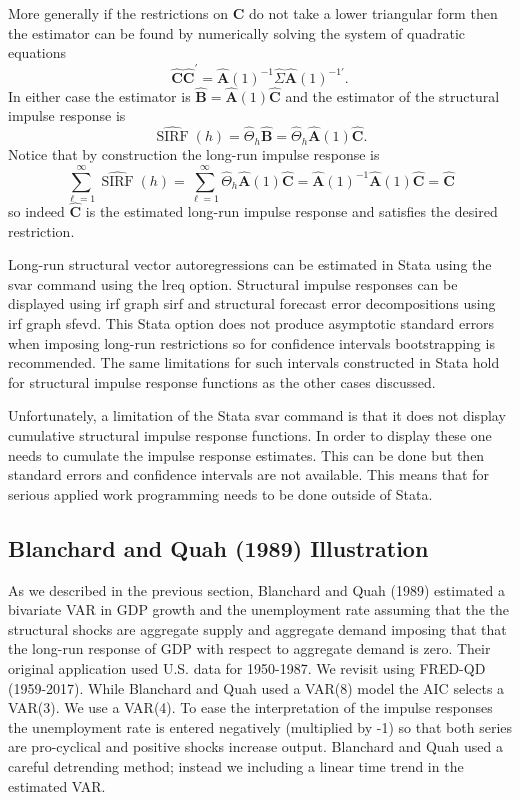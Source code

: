 \documentclass[10pt]{article}
\begin{document}
More generally if the restrictions on $\boldsymbol{C}$ do not take a lower triangular form then the estimator can be found by numerically solving the system of quadratic equations
$$
\widehat{\boldsymbol{C}} \widehat{\boldsymbol{C}}^{\prime}=\widehat{\boldsymbol{A}}(1)^{-1} \widehat{\Sigma} \widehat{\boldsymbol{A}}(1)^{-1 \prime} .
$$
In either case the estimator is $\widehat{\boldsymbol{B}}=\widehat{\boldsymbol{A}}(1) \widehat{\boldsymbol{C}}$ and the estimator of the structural impulse response is
$$
\widehat{\operatorname{SIRF}}(h)=\widehat{\Theta}_{h} \widehat{\boldsymbol{B}}=\widehat{\Theta}_{h} \widehat{\boldsymbol{A}}(1) \widehat{\boldsymbol{C}} .
$$
Notice that by construction the long-run impulse response is
$$
\sum_{\ell=1}^{\infty} \widehat{\operatorname{SIRF}}(h)=\sum_{\ell=1}^{\infty} \widehat{\Theta}_{h} \widehat{\boldsymbol{A}}(1) \widehat{\boldsymbol{C}}=\widehat{\boldsymbol{A}}(1)^{-1} \widehat{\boldsymbol{A}}(1) \widehat{\boldsymbol{C}}=\widehat{\boldsymbol{C}}
$$
so indeed $\widehat{\boldsymbol{C}}$ is the estimated long-run impulse response and satisfies the desired restriction.

Long-run structural vector autoregressions can be estimated in Stata using the svar command using the lreq option. Structural impulse responses can be displayed using irf graph sirf and structural forecast error decompositions using irf graph sfevd. This Stata option does not produce asymptotic standard errors when imposing long-run restrictions so for confidence intervals bootstrapping is recommended. The same limitations for such intervals constructed in Stata hold for structural impulse response functions as the other cases discussed.

Unfortunately, a limitation of the Stata svar command is that it does not display cumulative structural impulse response functions. In order to display these one needs to cumulate the impulse response estimates. This can be done but then standard errors and confidence intervals are not available. This means that for serious applied work programming needs to be done outside of Stata.

\subsection{Blanchard and Quah (1989) Illustration}
As we described in the previous section, Blanchard and Quah (1989) estimated a bivariate VAR in GDP growth and the unemployment rate assuming that the the structural shocks are aggregate supply and aggregate demand imposing that that the long-run response of GDP with respect to aggregate demand is zero. Their original application used U.S. data for 1950-1987. We revisit using FRED-QD (1959-2017). While Blanchard and Quah used a VAR(8) model the AIC selects a VAR(3). We use a VAR(4). To ease the interpretation of the impulse responses the unemployment rate is entered negatively (multiplied by -1) so that both series are pro-cyclical and positive shocks increase output. Blanchard and Quah used a careful detrending method; instead we including a linear time trend in the estimated VAR.
\end{document}
